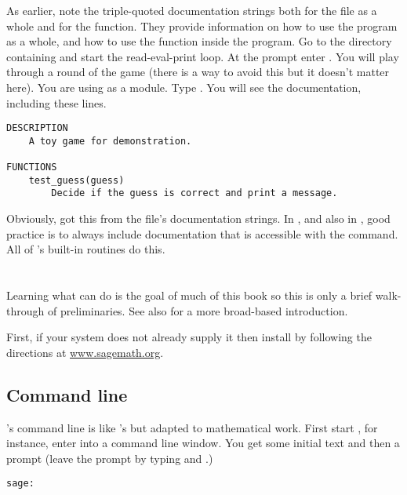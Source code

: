 As earlier, note the triple-quoted documentation strings both for the 
file as a whole and for the function.
They provide information on how to use the 
program as a whole,
and how to use the function inside the program. 
Go to the directory containing  and start 
the \python{} read-eval-print loop.
At the \inlinecode{>>>} prompt enter .
You will play through a round of the game (there is a way to avoid this
but it doesn't matter here).
You are using  as a module.
Type
.
You will see the documentation, including these lines.
\begin{lstlisting}
DESCRIPTION
    A toy game for demonstration.

FUNCTIONS
    test_guess(guess)
        Decide if the guess is correct and print a message. 
\end{lstlisting}
Obviously, \python{} got this from the file's documentation strings.
In \python{}, and also in \Sage, good practice is 
to always include documentation
that is accessible with the  command.
All of \Sage's built-in routines do this.





\section{\Sage}
Learning what \Sage{} can do is the goal of much of this book 
so this is only a brief walk-through of preliminaries.
See also \citep{SageTeam12} for a more broad-based introduction.

First, if your system does not already supply it then install \Sage{} 
by following the directions at
\href{http://www.sagemath.org}{www.sagemath.org}.



\subsection{Command line}
\Sage's command line is like \python's but adapted to 
mathematical work.
First start \Sage,
for instance, enter  into a command line window.
You get some initial text and then a prompt
(leave the prompt by typing 
and .)
\begin{lstlisting}[style=python]
sage:  
\end{lstlisting}

